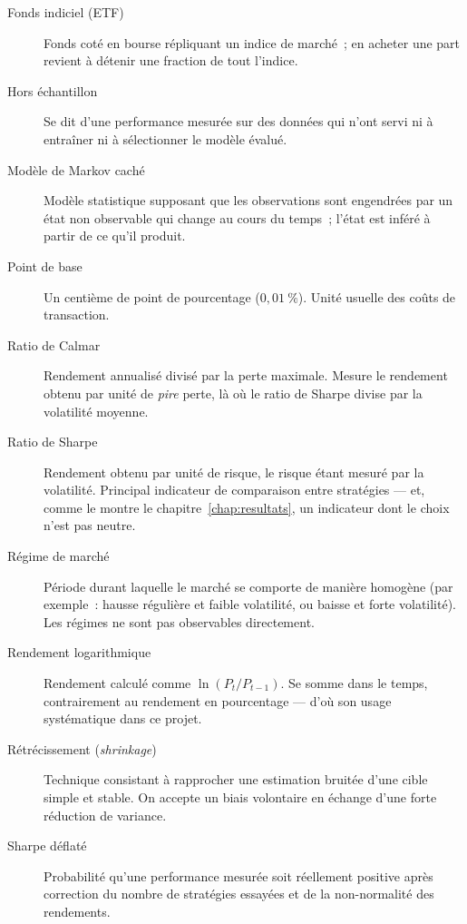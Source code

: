 \begin{description}
\item[Fonds indiciel (ETF)] Fonds coté en bourse répliquant un indice de marché~;
en acheter une part revient à détenir une fraction de tout l'indice.

\item[Hors échantillon] Se dit d'une performance mesurée sur des données qui
n'ont servi ni à entraîner ni à sélectionner le modèle évalué.

\item[Modèle de Markov caché] Modèle statistique supposant que les observations
sont engendrées par un état non observable qui change au cours du temps~; l'état
est inféré à partir de ce qu'il produit.

\item[Point de base] Un centième de point de pourcentage ($0{,}01~\%$). Unité
usuelle des coûts de transaction.

\item[Ratio de Calmar] Rendement annualisé divisé par la perte maximale. Mesure
le rendement obtenu par unité de \emph{pire} perte, là où le ratio de Sharpe
divise par la volatilité moyenne.

\item[Ratio de Sharpe] Rendement obtenu par unité de risque, le risque étant
mesuré par la volatilité. Principal indicateur de comparaison entre stratégies —
et, comme le montre le chapitre~\ref{chap:resultats}, un indicateur dont le
choix n'est pas neutre.

\item[Régime de marché] Période durant laquelle le marché se comporte de manière
homogène (par exemple~: hausse régulière et faible volatilité, ou baisse et forte
volatilité). Les régimes ne sont pas observables directement.

\item[Rendement logarithmique] Rendement calculé comme $\ln(P_t/P_{t-1})$. Se
somme dans le temps, contrairement au rendement en pourcentage — d'où son usage
systématique dans ce projet.

\item[Rétrécissement (\emph{shrinkage})] Technique consistant à rapprocher une
estimation bruitée d'une cible simple et stable. On accepte un biais volontaire
en échange d'une forte réduction de variance.

\item[Sharpe déflaté] Probabilité qu'une performance mesurée soit réellement
positive après correction du nombre de stratégies essayées et de la
non-normalité des rendements.


\end{description}
